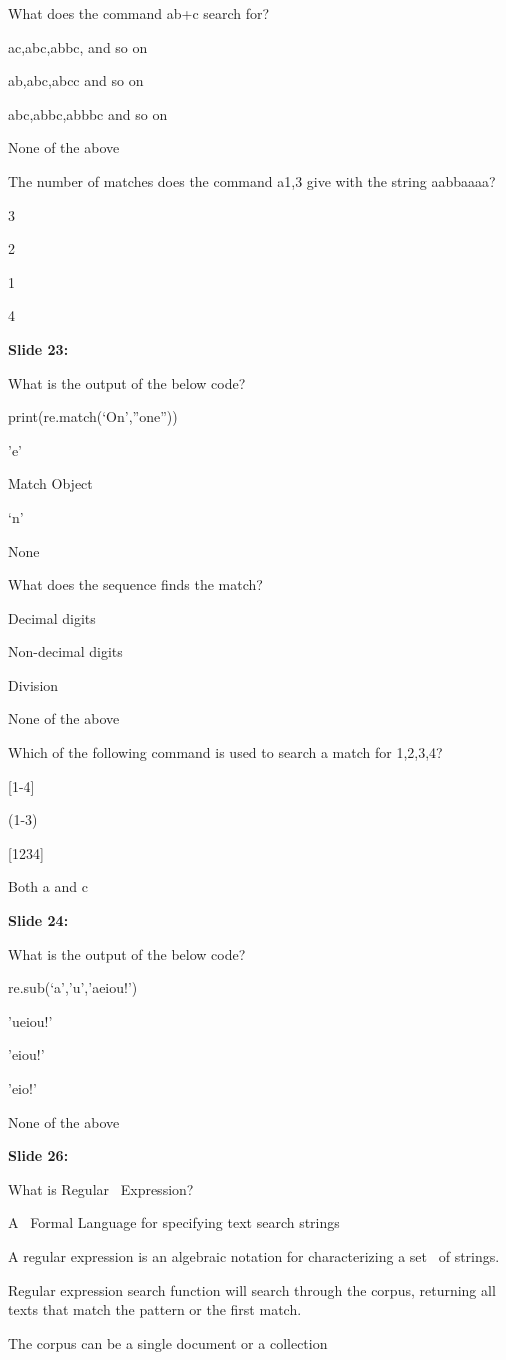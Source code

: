 \documentclass[11pt,a4paper]{article}
\begin{document}
What does the command ab+c search for?

ac,abc,abbc, and so on

ab,abc,abcc and so on

abc,abbc,abbbc and so on

None of the above

The number of matches does the command a{1,3} give with the string aabbaaaa?

3

2

1

4

\textbf{Slide 23:}

What is the output of the below code?

print(re.match(‘On’,”one”))

'e'

Match Object

‘n’

None

What does the sequence \D finds the match?

Decimal digits

Non-decimal digits

Division

None of the above

Which of the following command is used to search a match for 1,2,3,4?

[1-4]

(1-3)

[1234]

Both a and c

\textbf{Slide 24:}

What is the output of the below code?

re.sub(‘a’,’u’,’aeiou!’)

'ueiou!'

'eiou!'

'eio!'

None of the above

\textbf{Slide 26:}

What is Regular  Expression?

A  Formal Language for specifying text search strings

A regular expression is an algebraic notation for characterizing a set  of strings.

Regular expression search function will search through the corpus, returning all texts that match the pattern or the first match.

The corpus can be a single document or a collection
\end{document}

